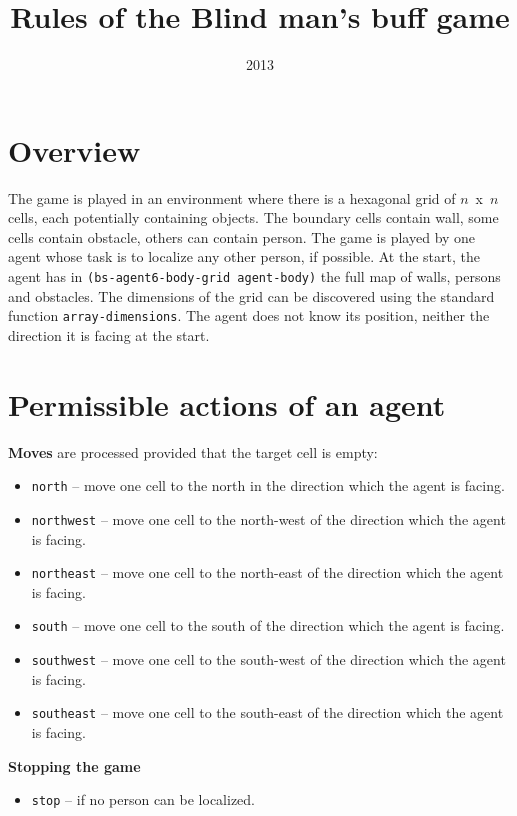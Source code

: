 \documentclass[a4paper,12pt]{article}
\title{Rules of the Blind man's buff game}
\author{}
\date{2013}
\begin{document}
\maketitle

\section*{Overview}

The game is played in an environment where there is a hexagonal grid of $n$~x~$n$ cells, each potentially containing
objects. The boundary cells contain wall, some cells contain obstacle, others can contain person. The game is
played by one agent whose task is to localize any other person, if possible. At the start, the agent has in
\texttt{(bs-agent6-body-grid agent-body)} the full map of walls, persons and obstacles. The
dimensions of the grid can be discovered using the standard function \texttt{array-dimensions}. The agent does not know its position, neither the direction it is facing at the start.

\section*{Permissible actions of an agent}

\textbf{Moves} are processed provided that the target cell is empty:

\begin{itemize}
\item \texttt{north} -- move one cell to the north in the direction which the agent is facing.
\item \texttt{northwest} -- move one cell to the  north-west of the direction which the agent is facing.
\item \texttt{northeast} -- move one cell to the north-east of the direction which the agent is facing.
\item \texttt{south} -- move one cell to the south of the direction which the agent is facing.
\item \texttt{southwest} -- move one cell to the south-west of the direction which the agent is facing.
\item \texttt{southeast} -- move one cell to the south-east of the direction which the agent is facing.
\end{itemize}

\textbf{Stopping the game}
\begin{itemize}
\item \texttt{stop} -- if  no person can be localized.
\end{itemize}
\end{document}
